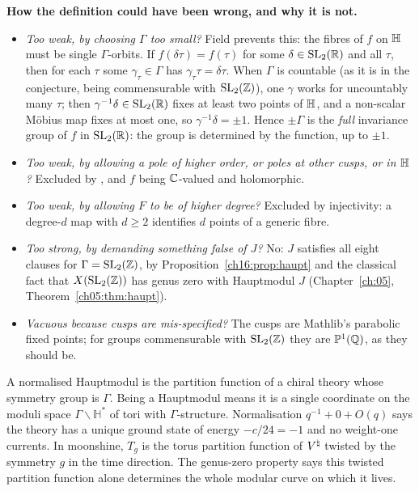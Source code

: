 \begin{dictionary}
\textbf{How the definition could have been wrong, and why it is not.}
\begin{itemize}
\item \emph{Too weak, by choosing $\Gamma$ too small?}  Field  prevents this: the fibres of $f$ on
  $\mathbb{H}$ must be single $\Gamma$-orbits.  If $f(\delta\tau)=f(\tau)$ for some $\delta\in\mathrm{SL}_2(\mathbb{R})$ and all
  $\tau$, then for each $\tau$ some $\gamma_\tau\in\Gamma$ has $\gamma_\tau\tau=\delta\tau$.  When $\Gamma$ is countable (as it is in the
  conjecture, being commensurable with $\mathrm{SL}_2(\mathbb{Z})$), one $\gamma$ works for uncountably many $\tau$; then
  $\gamma^{-1}\delta\in\mathrm{SL}_2(\mathbb{R})$ fixes at least two points of $\mathbb{H}$, and a non-scalar M\"obius map fixes
  at most one, so $\gamma^{-1}\delta=\pm1$.  Hence $\pm\Gamma$ is the \emph{full} invariance group of $f$ in
  $\mathrm{SL}_2(\mathbb{R})$: the group is determined by the function, up to $\pm1$.
\item \emph{Too weak, by allowing a pole of higher order, or poles at other cusps, or in $\mathbb{H}$?}  Excluded by
  ,  and $f$ being ${\mathbb{C}}$-valued and holomorphic.
\item \emph{Too weak, by allowing $F$ to be of higher degree?}  Excluded by injectivity: a degree-$d$ map with $d\ge2$
  identifies $d$ points of a generic fibre.
\item \emph{Too strong, by demanding something false of $J$?}  No: $J$ satisfies all eight clauses for
  $\Gamma=\mathrm{SL}_2(\mathbb{Z})$, by Proposition~\ref{ch16:prop:haupt} and the classical fact that $X(\mathrm{SL}_2(\mathbb{Z}))$ has genus
  zero with Hauptmodul $J$ (Chapter~\ref{ch:05}, Theorem~\ref{ch05:thm:haupt}).
\item \emph{Vacuous because cusps are mis-specified?}  The cusps are Mathlib's parabolic fixed points; for groups
  commensurable with $\mathrm{SL}_2(\mathbb{Z})$ they are $\mathbb{P}^1({\mathbb{Q}})$, as they should be.
\end{itemize}
\end{dictionary}

\begin{physics}
A normalised Hauptmodul is the partition function of a chiral theory whose symmetry group is $\Gamma$. Being a
Hauptmodul means it is a single coordinate on the moduli space $\Gamma\backslash\mathbb H^{*}$ of tori with
$\Gamma$-structure. Normalisation $q^{-1}+0+O(q)$ says the theory has a unique ground state of energy $-c/24=-1$ and
no weight-one currents. In moonshine, $T_g$ is the torus partition function of ${V^{\natural}}$ twisted by the symmetry $g$ in
the time direction. The genus-zero property says this twisted partition function alone determines the whole modular
curve on which it lives.
\end{physics}

